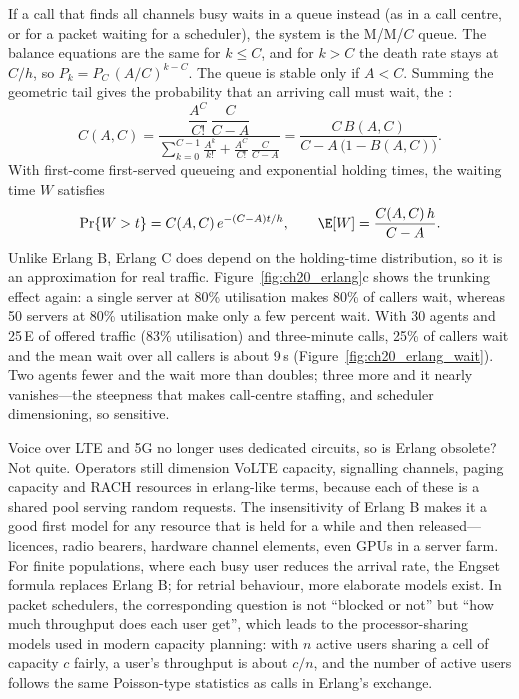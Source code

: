 If a call that finds all channels busy waits in a queue instead (as in a call centre, or for a packet waiting for
a scheduler), the system is the M/M/$C$ queue. The balance equations are the same for $k\le C$, and for $k>C$ the
death rate stays at $C/h$, so $P_k=P_C\,(A/C)^{k-C}$. The queue is stable only if $A<C$. Summing the geometric
tail gives the probability that an arriving call must wait, the :
\begin{equation}
C(A,C)=\frac{\dfrac{A^C}{C!}\,\dfrac{C}{C-A}}{\displaystyle\sum_{k=0}^{C-1}\frac{A^k}{k!}+\frac{A^C}{C!}\,\frac{C}{C-A}}
=\frac{C\,B(A,C)}{C-A\,\big(1-B(A,C)\big)} .
\label{eq:ch20:erlangc}
\end{equation}
With first-come first-served queueing and exponential holding times, the waiting time $W$ satisfies
\begin{equation}
\Pr\{W>t\}=C(A,C)\,e^{-(C-A)t/h},\qquad \E[W]=\frac{C(A,C)\,h}{C-A}.
\end{equation}
Unlike Erlang B, Erlang C does depend on the holding-time distribution, so it is an approximation for real traffic.
Figure~\ref{fig:ch20_erlang}c shows the trunking effect again: a single server at 80\% utilisation makes 80\% of
callers wait, whereas 50 servers at 80\% utilisation make only a few percent wait. With 30 agents and 25\,E of
offered traffic (83\% utilisation) and three-minute calls, 25\% of callers wait and the mean wait over all callers
is about 9\,s (Figure~\ref{fig:ch20_erlang_wait}). Two agents fewer and the wait more than doubles; three more
and it nearly vanishes---the steepness that makes call-centre staffing, and scheduler dimensioning, so sensitive.


\begin{inpractice}
Voice over LTE and 5G no longer uses dedicated circuits, so is Erlang obsolete? Not quite. Operators still
dimension VoLTE capacity, signalling channels, paging capacity and RACH resources in erlang-like terms, because each
of these is a shared pool serving random requests. The insensitivity of Erlang B makes it a good first model for any
resource that is held for a while and then released---licences, radio bearers, hardware channel elements, even GPUs
in a server farm. For finite populations, where each busy user reduces the arrival rate, the Engset formula replaces
Erlang B; for retrial behaviour, more elaborate models exist. In packet schedulers, the corresponding question is
not ``blocked or not'' but ``how much throughput does each user get'', which leads to the processor-sharing models
used in modern capacity planning: with $n$ active users sharing a cell of capacity $c$ fairly, a user's throughput is
about $c/n$, and the number of active users follows the same Poisson-type statistics as calls in Erlang's exchange.
\end{inpractice}

